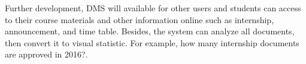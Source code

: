 Further development, DMS will available for other users and students can access to their course materials and other information online such as internship, announcement, and time table. Besides, the system can analyze all documents, then convert it to visual statistic. For example, how many internship documents are approved in 2016?.